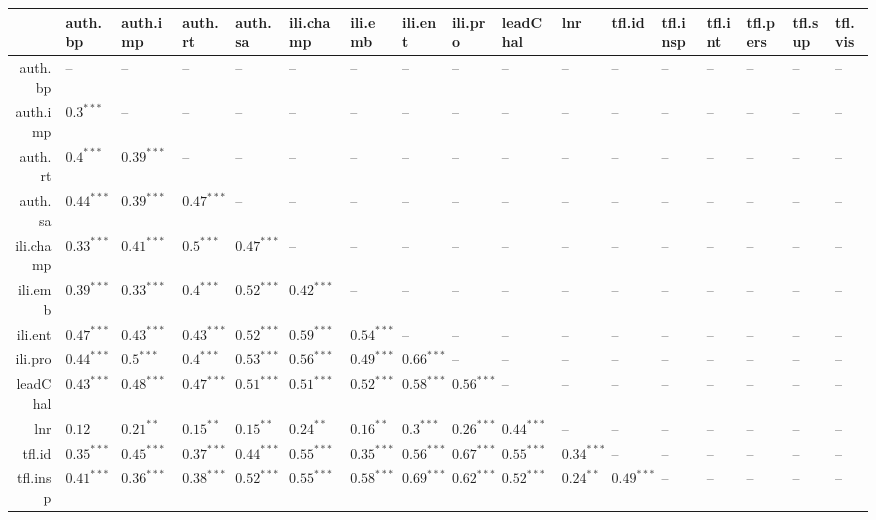 \begin{table}[ht]
\centering
\begin{tabular}{rllllllllllllllll}
  \hline
 & auth.bp & auth.imp & auth.rt & auth.sa & ili.champ & ili.emb & ili.ent & ili.pro & leadChal & lnr & tfl.id & tfl.insp & tfl.int & tfl.pers & tfl.sup & tfl.vis \\ 
  \hline
auth.bp & -- & -- & -- & -- & -- & -- & -- & -- & -- & -- & -- & -- & -- & -- & -- & -- \\ 
  auth.imp & $0.3^{***}$ & -- & -- & -- & -- & -- & -- & -- & -- & -- & -- & -- & -- & -- & -- & -- \\ 
  auth.rt & $0.4^{***}$ & $0.39^{***}$ & -- & -- & -- & -- & -- & -- & -- & -- & -- & -- & -- & -- & -- & -- \\ 
  auth.sa & $0.44^{***}$ & $0.39^{***}$ & $0.47^{***}$ & -- & -- & -- & -- & -- & -- & -- & -- & -- & -- & -- & -- & -- \\ 
  ili.champ & $0.33^{***}$ & $0.41^{***}$ & $0.5^{***}$ & $0.47^{***}$ & -- & -- & -- & -- & -- & -- & -- & -- & -- & -- & -- & -- \\ 
  ili.emb & $0.39^{***}$ & $0.33^{***}$ & $0.4^{***}$ & $0.52^{***}$ & $0.42^{***}$ & -- & -- & -- & -- & -- & -- & -- & -- & -- & -- & -- \\ 
  ili.ent & $0.47^{***}$ & $0.43^{***}$ & $0.43^{***}$ & $0.52^{***}$ & $0.59^{***}$ & $0.54^{***}$ & -- & -- & -- & -- & -- & -- & -- & -- & -- & -- \\ 
  ili.pro & $0.44^{***}$ & $0.5^{***}$ & $0.4^{***}$ & $0.53^{***}$ & $0.56^{***}$ & $0.49^{***}$ & $0.66^{***}$ & -- & -- & -- & -- & -- & -- & -- & -- & -- \\ 
  leadChal & $0.43^{***}$ & $0.48^{***}$ & $0.47^{***}$ & $0.51^{***}$ & $0.51^{***}$ & $0.52^{***}$ & $0.58^{***}$ & $0.56^{***}$ & -- & -- & -- & -- & -- & -- & -- & -- \\ 
  lnr & $0.12$ & $0.21^{**}$ & $0.15^{**}$ & $0.15^{**}$ & $0.24^{**}$ & $0.16^{**}$ & $0.3^{***}$ & $0.26^{***}$ & $0.44^{***}$ & -- & -- & -- & -- & -- & -- & -- \\ 
  tfl.id & $0.35^{***}$ & $0.45^{***}$ & $0.37^{***}$ & $0.44^{***}$ & $0.55^{***}$ & $0.35^{***}$ & $0.56^{***}$ & $0.67^{***}$ & $0.55^{***}$ & $0.34^{***}$ & -- & -- & -- & -- & -- & -- \\ 
  tfl.insp & $0.41^{***}$ & $0.36^{***}$ & $0.38^{***}$ & $0.52^{***}$ & $0.55^{***}$ & $0.58^{***}$ & $0.69^{***}$ & $0.62^{***}$ & $0.52^{***}$ & $0.24^{**}$ & $0.49^{***}$ & -- & -- & -- & -- & -- \\ 

\end{tabular}
\end{table}
